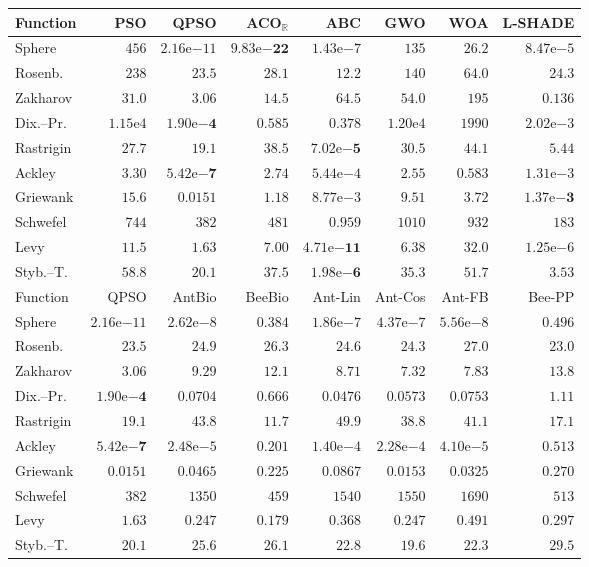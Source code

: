 \begin{tabular}{lrrrrrrr}
\toprule
Function & PSO & QPSO & ACO$_\mathbb{R}$ & ABC & GWO & WOA & L-SHADE \\
\midrule
Sphere & $456$ & $2.16\mathrm{e}{-11}$ & $\mathbf{9.83\mathrm{e}{-22}}$ & $1.43\mathrm{e}{-7}$ & $135$ & $26.2$ & $8.47\mathrm{e}{-5}$ \\
Rosenb. & $238$ & $23.5$ & $28.1$ & $\mathbf{12.2}$ & $140$ & $64.0$ & $24.3$ \\
Zakharov & $31.0$ & $3.06$ & $14.5$ & $64.5$ & $54.0$ & $195$ & $\mathbf{0.136}$ \\
Dix.--Pr. & $1.15\mathrm{e}{4}$ & $\mathbf{1.90\mathrm{e}{-4}}$ & $0.585$ & $0.378$ & $1.20\mathrm{e}{4}$ & $1990$ & $2.02\mathrm{e}{-3}$ \\
Rastrigin & $27.7$ & $19.1$ & $38.5$ & $\mathbf{7.02\mathrm{e}{-5}}$ & $30.5$ & $44.1$ & $5.44$ \\
Ackley & $3.30$ & $\mathbf{5.42\mathrm{e}{-7}}$ & $2.74$ & $5.44\mathrm{e}{-4}$ & $2.55$ & $0.583$ & $1.31\mathrm{e}{-3}$ \\
Griewank & $15.6$ & $0.0151$ & $1.18$ & $8.77\mathrm{e}{-3}$ & $9.51$ & $3.72$ & $\mathbf{1.37\mathrm{e}{-3}}$ \\
Schwefel & $744$ & $382$ & $481$ & $\mathbf{0.959}$ & $1010$ & $932$ & $183$ \\
Levy & $11.5$ & $1.63$ & $7.00$ & $\mathbf{4.71\mathrm{e}{-11}}$ & $6.38$ & $32.0$ & $1.25\mathrm{e}{-6}$ \\
Styb.--T. & $58.8$ & $20.1$ & $37.5$ & $\mathbf{1.98\mathrm{e}{-6}}$ & $35.3$ & $51.7$ & $3.53$ \\
\midrule
Function & QPSO & AntBio & BeeBio & Ant-Lin & Ant-Cos & Ant-FB & Bee-PP \\
\midrule
Sphere & $2.16\mathrm{e}{-11}$ & $2.62\mathrm{e}{-8}$ & $0.384$ & $1.86\mathrm{e}{-7}$ & $4.37\mathrm{e}{-7}$ & $5.56\mathrm{e}{-8}$ & $0.496$ \\
Rosenb. & $23.5$ & $24.9$ & $26.3$ & $24.6$ & $24.3$ & $27.0$ & $23.0$ \\
Zakharov & $3.06$ & $9.29$ & $12.1$ & $8.71$ & $7.32$ & $7.83$ & $13.8$ \\
Dix.--Pr. & $\mathbf{1.90\mathrm{e}{-4}}$ & $0.0704$ & $0.666$ & $0.0476$ & $0.0573$ & $0.0753$ & $1.11$ \\
Rastrigin & $19.1$ & $43.8$ & $11.7$ & $49.9$ & $38.8$ & $41.1$ & $17.1$ \\
Ackley & $\mathbf{5.42\mathrm{e}{-7}}$ & $2.48\mathrm{e}{-5}$ & $0.201$ & $1.40\mathrm{e}{-4}$ & $2.28\mathrm{e}{-4}$ & $4.10\mathrm{e}{-5}$ & $0.513$ \\
Griewank & $0.0151$ & $0.0465$ & $0.225$ & $0.0867$ & $0.0153$ & $0.0325$ & $0.270$ \\
Schwefel & $382$ & $1350$ & $459$ & $1540$ & $1550$ & $1690$ & $513$ \\
Levy & $1.63$ & $0.247$ & $0.179$ & $0.368$ & $0.247$ & $0.491$ & $0.297$ \\
Styb.--T. & $20.1$ & $25.6$ & $26.1$ & $22.8$ & $19.6$ & $22.3$ & $29.5$ \\
\bottomrule
\end{tabular}
